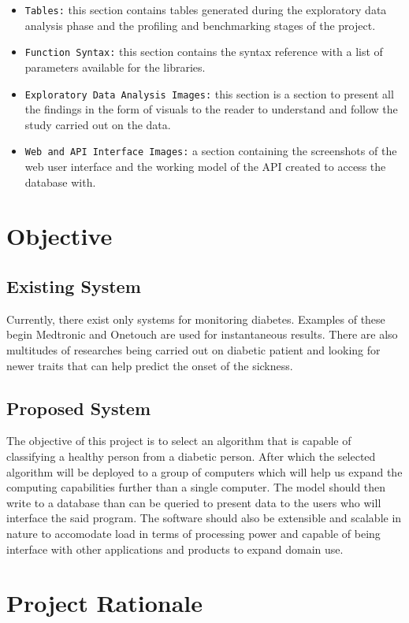 \documentclass[12pt]{article}
\begin{document}
\begin{itemize}
\item \texttt{Tables:} this section contains tables generated during the exploratory data analysis phase and the profiling and benchmarking stages of the project.
\item \texttt{Function Syntax:} this section contains the syntax reference with a list of parameters available for the libraries.
\item \texttt{Exploratory Data Analysis Images:} this section is a section to present all the findings in the form of visuals to the reader to understand and follow the study carried out on the data.
\item \texttt{Web and API Interface Images:} a section containing the screenshots of the web user interface and the working model of the API created to access the database with.
\end{itemize}


\clearpage
\newpage
\section{Objective}
\subsection{Existing System}
Currently, there exist only systems for monitoring diabetes. Examples of these begin Medtronic\cite{medtronic} and Onetouch\cite{onetouch} are used for instantaneous results. There are also multitudes of researches being carried out on diabetic patient and looking for newer traits that can help predict the onset of the sickness.

\subsection{Proposed System}
The objective of this project is to select an algorithm that is capable of classifying a healthy person from a diabetic person. After which the selected algorithm will be deployed to a group of computers which will help us expand the computing capabilities further than a single computer. The model should then write to a database than can be queried to present data to the users who will interface the said program. The software should also be extensible and scalable in nature to accomodate load in terms of processing power and capable of being interface with other applications and products to expand domain use.

\newpage
\section{Project Rationale}
\end{document}
